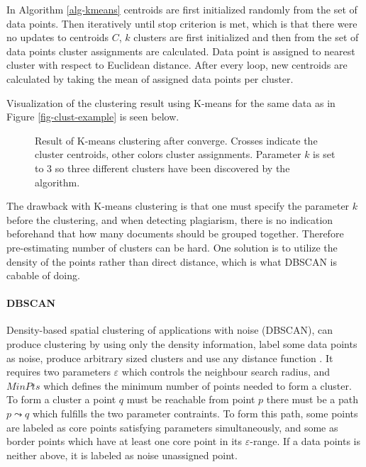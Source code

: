 \noindent 

In Algorithm \ref{alg-kmeans} centroids are first initialized randomly from the set of data points. Then iteratively until stop criterion is met, which is that there were no updates to centroids $C$, $k$ clusters are first initialized and then from the set of data points cluster assignments are calculated. Data point is assigned to nearest cluster with respect to Euclidean distance. After every loop, new centroids are calculated by taking the mean of assigned data points per cluster. 

Visualization of the clustering result using K-means for the same data as in Figure \ref{fig-clust-example} is seen below.

\begin{figure}[ht]
\centering
\setlength\figureheight{7cm}
\setlength\figurewidth{7cm}

\caption{Result of K-means clustering after converge. Crosses indicate the cluster centroids, other colors cluster assignments. Parameter $k$ is set to 3 so three different clusters have been discovered by the algorithm.} \label{fig-kmeans-example}
\end{figure}



The drawback with K-means clustering is that one must specify the parameter $k$ before the clustering, and when detecting plagiarism, there is no indication beforehand that how many documents should be grouped together. Therefore pre-estimating number of clusters can be hard. One solution is to utilize the density of the points rather than direct distance, which is what DBSCAN is cabable of doing.

\paragraph{DBSCAN}

Density-based spatial clustering of applications with noise (DBSCAN), can produce clustering by using only the density information, label some data points as noise, produce arbitrary sized clusters and use any distance function \cite{Ester:1996:DAD:3001460.3001507}. It requires two parameters $\varepsilon$ which controls the neighbour search radius, and $MinPts$ which defines the minimum number of points needed to form a cluster. To form a cluster a point $q$ must be reachable from point $p$ \ie there must be a path $p \leadsto q$ which fulfills the two parameter contraints. To form this path, some points are labeled as core points satisfying parameters simultaneously, and some as border points which have at least one core point in its $\varepsilon$-range. If a data points is neither above, it is labeled as noise \ie unassigned point.


